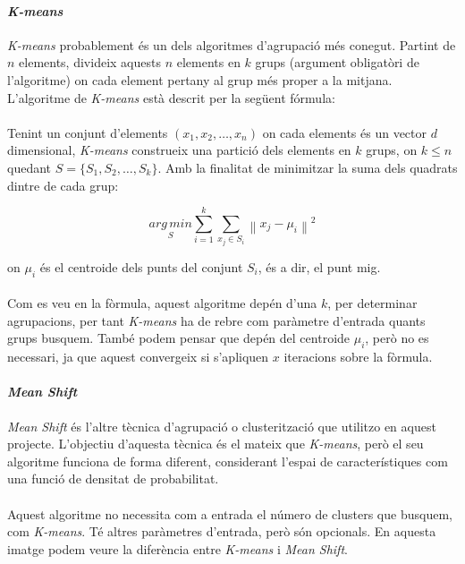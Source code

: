 \documentclass[12pt,a4paper,catalan]{article}
\begin{document}
\paragraph{\textit{K-means}}
\textit{K-means} probablement és un dels algoritmes d'agrupació més conegut. Partint de $n$ elements, divideix aquests $n$ elements en $k$ grups (argument obligatòri de l'algoritme) on cada element pertany al grup més proper a la mitjana. L'algoritme de \textit{K-means} està descrit per la següent fórmula:
\\
\\
Tenint un conjunt d'elements $(x_1, x_2, \ldots, x_n)$ on cada elements és un vector $d$ dimensional, \textit{K-means} construeix una partició dels elements en $k$ grups, on $k \leq n$ quedant $S = \{S_1, S_2, \ldots, S_k\}$. Amb la finalitat de minimitzar la suma dels quadrats dintre de cada grup:

$$ \underset{S} {arg\,min} \sum_{i=1}^{k} \sum_{x_j \in S_i} \left\| x_j - \mu_i \right\|^2 $$

on $\mu_i$ és el centroide dels punts del conjunt $S_i$, és a dir, el punt mig.
\\
\\
Com es veu en la fòrmula, aquest algoritme depén d'una $k$, per determinar agrupacions, per tant \textit{K-means} ha de rebre com paràmetre d'entrada quants grups busquem. També podem pensar que depén del centroide $\mu_i$, però no es necessari, ja que aquest convergeix si s'apliquen $x$ iteracions sobre la fòrmula.

\newpage

\paragraph{\textit{Mean Shift}}
\textit{Mean Shift} és l'altre tècnica d'agrupació o clusterització que utilitzo en aquest projecte. L'objectiu d'aquesta tècnica és el mateix que \textit{K-means}, però el seu algoritme funciona de forma diferent, considerant l'espai de característiques com una funció de densitat de probabilitat.
\\
\\
Aquest algoritme no necessita com a entrada el número de clusters que busquem, com \textit{K-means}. Té altres paràmetres d'entrada, però són opcionals. En aquesta imatge podem veure la diferència entre \textit{K-means} i \textit{Mean Shift}.
\end{document}
